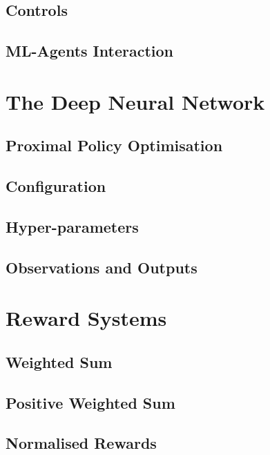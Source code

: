 \documentclass{article}
\begin{document}
\subsection{Controls}
\lipsum[2][1]

\subsection{ML-Agents Interaction}
\lipsum[2][1]

\section{The Deep Neural Network}
\lipsum[2][1]

\subsection{Proximal Policy Optimisation}
\lipsum[2][1]

\subsection{Configuration}
\lipsum[2][1]

\subsection{Hyper-parameters}
\lipsum[2][1]

\subsection{Observations and Outputs}
\lipsum[2][1]

\section{Reward Systems}
\lipsum[2][1]

\subsection{Weighted Sum}
\lipsum[2][1]

\subsection{Positive Weighted Sum}
\lipsum[2][1]

\subsection{Normalised Rewards}
\lipsum[2][1]
\end{document}
